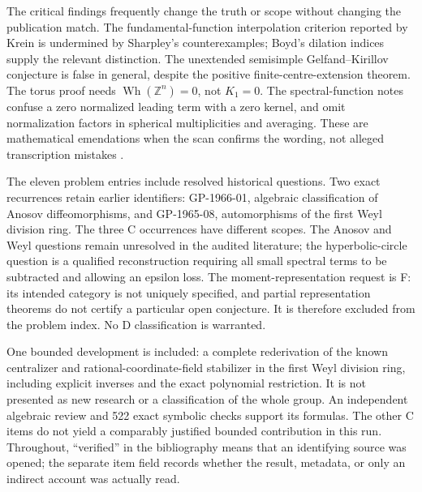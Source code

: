 The critical findings frequently change the truth or scope without changing
the publication match. The fundamental-function interpolation criterion
reported by Krein is undermined by Sharpley's counterexamples; Boyd's dilation
indices supply the relevant distinction. The unextended semisimple
Gelfand--Kirillov conjecture is false in general, despite the positive
finite-centre-extension theorem. The torus proof needs
\(\operatorname{Wh}(\mathbb Z^n)=0\), not \(K_1=0\). The spectral-function
notes confuse a zero normalized leading term with a zero kernel, and omit
normalization factors in spherical multiplicities and averaging. These are
mathematical emendations when the scan confirms the wording, not alleged
transcription mistakes \citep{sharpley1975interpolation,premet2010modular,
basshellerswan1964whitehead,hormander1968spectral}.

The eleven problem entries include resolved historical questions. Two exact
recurrences retain earlier identifiers: GP-1966-01, algebraic classification
of Anosov diffeomorphisms, and GP-1965-08, automorphisms of the first Weyl
division ring. The three C occurrences have different scopes. The
Anosov and Weyl questions remain unresolved in the audited literature; the
hyperbolic-circle question is a qualified reconstruction requiring all small
spectral terms to be subtracted and allowing an epsilon loss. The moment-representation request
is F: its intended category is not uniquely specified, and partial
representation theorems do not certify a particular open conjecture. It is
therefore excluded from the problem index. No D classification is warranted.

One bounded development is included: a complete rederivation of the known
centralizer and rational-coordinate-field stabilizer in the first Weyl
division ring, including explicit inverses and the exact polynomial
restriction. It is not presented as new research or a classification of the
whole group. An independent algebraic review and 522 exact symbolic checks
support its formulas. The other C items do not yield a comparably justified
bounded contribution in this run. Throughout, ``verified'' in the bibliography
means that an identifying source was opened; the separate item field records
whether the result, metadata, or only an indirect account was actually read.
